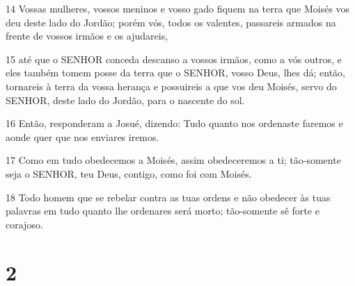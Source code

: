 \par 14 Vossas mulheres, vossos meninos e vosso gado fiquem na terra que Moisés vos deu deste lado do Jordão; porém vós, todos os valentes, passareis armados na frente de vossos irmãos e os ajudareis,
\par 15 até que o SENHOR conceda descanso a vossos irmãos, como a vós outros, e eles também tomem posse da terra que o SENHOR, vosso Deus, lhes dá; então, tornareis à terra da vossa herança e possuireis a que vos deu Moisés, servo do SENHOR, deste lado do Jordão, para o nascente do sol.
\par 16 Então, responderam a Josué, dizendo: Tudo quanto nos ordenaste faremos e aonde quer que nos enviares iremos.
\par 17 Como em tudo obedecemos a Moisés, assim obedeceremos a ti; tão-somente seja o SENHOR, teu Deus, contigo, como foi com Moisés.
\par 18 Todo homem que se rebelar contra as tuas ordens e não obedecer às tuas palavras em tudo quanto lhe ordenares será morto; tão-somente sê forte e corajoso.

\chapter{2}

